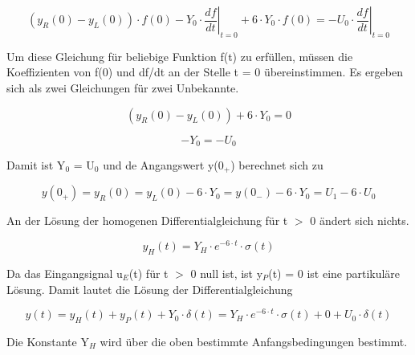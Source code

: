 \begin{equation}\label{eq:threehundredthirtyfive}
\left(y_{R} \left(0\right)-y_{L} \left(0\right)\right)\cdot f\left(0\right)-Y_{0} \cdot \left. \frac{df}{dt} \right|_{t=0} +6\cdot Y_{0} \cdot f\left(0\right)=-U_{0} \cdot \left. \frac{df}{dt} \right|_{t=0}
\end{equation}

\noindent Um diese Gleichung f\"{u}r beliebige Funktion f(t) zu erf\"{u}llen, m\"{u}ssen die Koeffizienten von f(0) und df/dt an der Stelle t = 0 \"{u}bereinstimmen. Es ergeben sich als zwei Gleichungen f\"{u}r zwei Unbekannte.

\begin{equation}\label{eq:threehundredthirtysix}
\left(y_{R} \left(0\right)-y_{L} \left(0\right)\right)+6\cdot Y_{0} =0
\end{equation}

\begin{equation}\label{eq:threehundredthirtyseven}
-Y_{0} =-U_{0}
\end{equation}

\noindent Damit ist Y${}_{0}$ = U${}_{0}$ und de Angangswert y(0${}_{+}$) berechnet sich zu

\begin{equation}\label{eq:threehundredthirtyeight}
y\left(0_{+} \right)=y_{R} \left(0\right)=y_{L} \left(0\right)-6\cdot Y_{0} =y\left(0_{-} \right)-6\cdot Y_{0} =U_{1} -6\cdot U_{0}
\end{equation}

\noindent An der L\"{o}sung der homogenen Differentialgleichung f\"{u}r t $\mathrm{>}$ 0 \"{a}ndert sich nichts. 

\begin{equation}\label{eq:threehundredthirtynine}
y_{H} \left(t\right)=Y_{H} \cdot e^{-6\cdot t} \cdot \sigma \left(t\right)
\end{equation}

\noindent Da das Eingangsignal u${}_{E}$(t) f\"{u}r t $\mathrm{>}$ 0 null ist, ist y${}_{P}$(t) = 0 ist eine partikul\"{a}re L\"{o}sung. Damit lautet die L\"{o}sung der Differentialgleichung

\begin{equation}\label{eq:threehundredfourty}
y\left(t\right)=y_{H} \left(t\right)+y_{P} \left(t\right)+Y_{0} \cdot \delta \left(t\right)=Y_{H} \cdot e^{-6\cdot t} \cdot \sigma \left(t\right)+0+U_{0} \cdot \delta \left(t\right)
\end{equation}

\noindent Die Konstante Y${}_{H}$ wird \"{u}ber die oben bestimmte Anfangsbedingungen bestimmt. 

